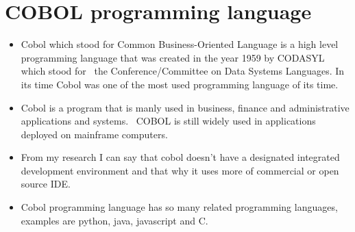 \documentclass{article}
\begin{document}
\section{COBOL programming language}
\begin{itemize}
	\item Cobol which stood for Common Business-Oriented Language  is a high level programming language that was created in the year 1959 by CODASYL which stood for  the Conference/Committee on Data Systems Languages. In its time Cobol was one of the most used programming language of its time.
	\item Cobol is a program that is manly used in business, finance and administrative applications and systems.  COBOL is still widely used in applications deployed on mainframe computers. 
	\item From my research I can say that cobol doesn’t have a designated integrated development environment and that why it uses more of  commercial or open source IDE.
	\item Cobol programming language has so many related programming languages, examples are python, java, javascript and C.
\end{itemize}

 
\end{document}
